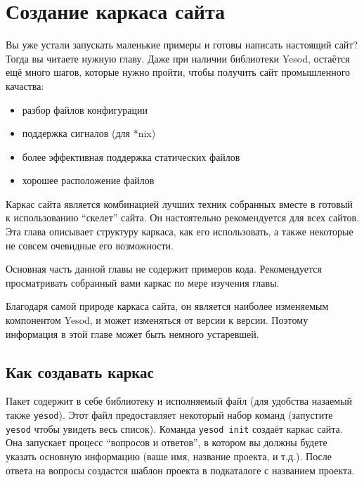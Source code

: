 \chapter{Создание каркаса сайта}

Вы уже устали запускать маленькие примеры и готовы написать настоящий сайт?
Тогда вы читаете нужную главу. Даже при наличии библиотеки Yesod,
остаётся ещё много шагов, которые нужно пройти, чтобы получить сайт
промышленного качаства:

\begin{itemize}
  \item разбор файлов конфигурации
  \item поддержка сигналов (для *nix)
  \item более эффективная поддержка статических файлов
  \item хорошее расположение файлов 
\end{itemize}

Каркас сайта является комбинацией лучших техник собранных вместе в готовый к 
использованию ``скелет'' сайта. Он настоятельно рекомендуется для всех сайтов.
Эта глава описывает структуру каркаса, как его использовать, а также некоторые 
не совсем очевидные его возможности.

Основная часть данной главы не содержит примеров кода. Рекомендуется 
просматривать собранный вами каркас по мере изучения главы.

\begin{remark}
  Благодаря самой природе каркаса сайта, он является наиболее изменяемым компонентом Yesod, и 
  может изменяться от версии к версии. Поэтому информация в этой главе может быть немного устаревшей.
\end{remark}

\section{Как создавать каркас}

Пакет 
содержит в себе библиотеку и исполняемый файл (для удобства 
назаемый также \lstinline!yesod!). Этот файл предоставляет некоторый набор 
команд (запустите \lstinline!yesod! чтобы увидеть весь список). Команда
\lstinline!yesod init! создаёт каркас сайта. Она запускает процесс
``вопросов и ответов'', в котором вы должны будете указать основную информацию
(ваше имя, название проекта, и т.д.). После ответа на вопросы создастся 
шаблон проекта в подкаталоге с названием проекта.

